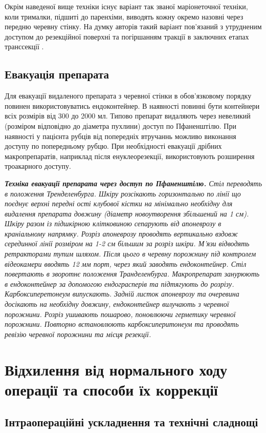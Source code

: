 \begin{refsection}
Окрім наведеної вище техніки існує варіант так званої маріонеточної техніки, коли трималки, підшиті до паренхіми, виводять кожну окремо назовні через передню черевну стінку. На думку авторів такий варіант пов'язаний з утрудненим доступом до резекційної поверхні та погіршанням тракції в заключних етапах транссекції \cite{Hsu2012}.

\subsection{Евакуація препарата}
Для евакуації видаленого препарата з черевної стінки в обов'язковому порядку повинен використовуватись ендоконтейнер. В наявності повинні бути контейнери всіх розмірів від 300 до 2000 мл. Типово препарат видаляють через невеликий (розміром відповідно до діаметра пухлини) доступ по Пфаненштілю. При наявності у пацієнта рубців від попередніх втручаннь можливо виконання доступу по попередньому рубцю. При необхідності евакуації дрібних макропрепаратів, наприклад після енуклеорезекції, використовують розширення троакарного доступу.

\textit{ \textbf{Техніка евакуації препарата через доступ по Пфаненштілю.} Стіл переводять в положення Тренделенбурга. Шкіру розсікають горизонтально по лінії що поєднує верхні передні ості клубової кістки на мінімально необхідну для видалення препарата довжину (діаметр новоутворення збільшений на 1 см). Шкіру разом із підшкірною клітковиною сепарують від апоневрозу в краніальному напрямку. Розріз апоневрозу проводять вертикально вздовж серединної лінії розміром на 1-2 см більшим за розріз шкіри. М'язи відводять ретракторами тупим шляхом. Після цього в черевну порожнину під контролем відеокамери вводять 12 мм порт, через який заводять ендоконтейнер. Стіл повертають в зворотнє положення Транделенбурга. Макропрепарат занурюють в ендоконтейнер за допомогою ендограсперів та підтягують до розрізу. Карбоксиперетонеум випускають. Задній листок апоневрозу та очеревина досікають на необхідну довжину, ендоконтейнер вилучають з черевної порожнини. Розріз ушивають пошарово, поновлюючи герметику черевної порожнини. Повторно встановлюють карбоксиперитонеум та проводять ревізію черевної порожнини та місця резекції.}


\section{Відхилення від нормального ходу операції та способи їх коррекції}

\subsection{Інтраопераційні ускладнення та технічні сладнощі}


\end{refsection}
